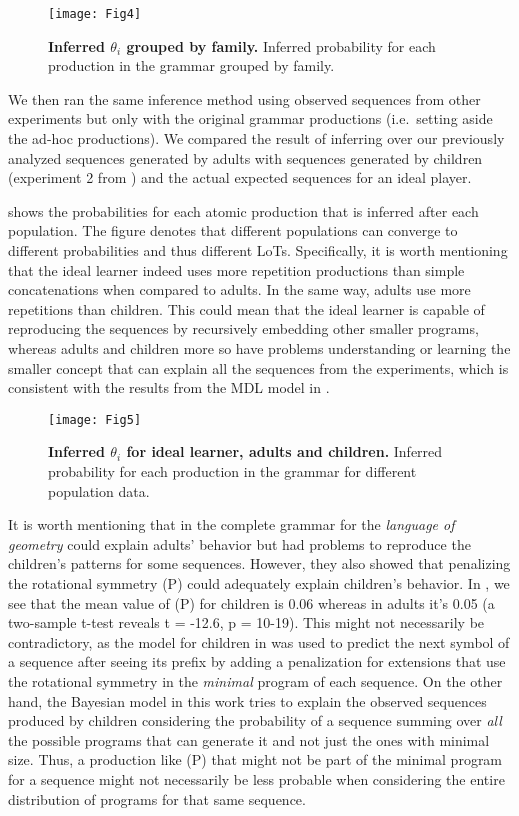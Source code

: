 \begin{figure}[!ht]
    \centering
    \texttt{[image: Fig4]}
    \caption{{\bf Inferred $\theta_i$ grouped by family.} Inferred probability for each production in the grammar grouped by family.}
    \label{fig:thetaGrouped}
\end{figure}

We then ran the same inference method using observed sequences from other experiments but only with the original grammar productions (i.e.\ setting aside the ad-hoc productions). We compared the result of inferring over our previously analyzed sequences generated by adults with sequences generated by children (experiment 2 from  \cite{marie2016}) and the actual expected sequences for an ideal player.

 shows the probabilities for each atomic production that is inferred after each population. The figure denotes that different populations can converge to different probabilities and thus different LoTs. Specifically, it is worth mentioning that the ideal learner indeed uses more repetition productions than simple concatenations when compared to adults. In the same way, adults use more repetitions than children. This could mean that the ideal learner is capable of reproducing the sequences by recursively embedding other smaller programs, whereas adults and children more so have problems understanding or learning the smaller concept that can explain all the sequences from the experiments, which is consistent with the results from the MDL model in \cite{marie2016}.

\begin{figure}[!ht]
    \centering
    \texttt{[image: Fig5]}
    \caption{{\bf Inferred $\theta_i$ for ideal learner, adults and children.} Inferred probability for each production in the grammar for different population data.}
    \label{fig:adultVsChildren}
\end{figure}

It is worth mentioning that in \cite{marie2016} the complete grammar for the \textit{language of geometry} could explain adults' behavior but had problems to reproduce the children's patterns for some sequences. However, they also showed that penalizing the rotational symmetry (P) could adequately explain children's behavior. In , we see that the mean value of (P) for children is 0.06 whereas in adults it's 0.05 (a two-sample t-test reveals t = -12.6, p = 10-19). This might not necessarily be contradictory, as the model for children in \cite{marie2016} was used to predict the next symbol of a sequence after seeing its prefix by adding a penalization for extensions that use the rotational symmetry in the {\em minimal} program of each sequence. On the other hand, the Bayesian model in this work tries to explain the observed sequences produced by children considering the probability of a sequence summing over {\em all} the possible programs that can generate it and not just the ones with minimal size. Thus, a production like (P) that might not be part of the minimal program for a sequence might not necessarily be less probable when considering the entire distribution of programs for that same sequence.

